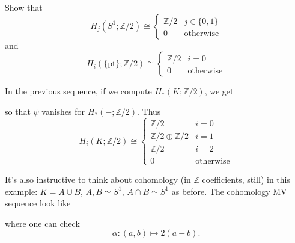 \documentclass[a4paper,11pt]{article}
\begin{document}
	\begin{exer}
		Show that
		\[
			H_j(S^1; \mathbb{Z}/2) \cong \begin{cases}
				\mathbb{Z}/2 & j \in \{0,1\}\\
				0 & \text{otherwise}
			\end{cases}
		\]
		and
		\[
			H_i(\{\text{pt}\};\mathbb{Z}/2)\cong\begin{cases}
				\mathbb{Z}/2 & i=0\\
				0 & \text{otherwise}
			\end{cases}	
		\]
	\end{exer}

	In the previous sequence, if we compute $H_*(K;\mathbb{Z}/2)$, we get
	\begin{center}
	\end{center}
	so that $\psi$ vanishes for $H_*(-; \mathbb{Z}/2)$. Thus
	\[
		H_i (K; \mathbb{Z}/2) \cong \begin{cases}
			\mathbb{Z}/2 & i=0\\
			\mathbb{Z}/2 \oplus \mathbb{Z}/2 & i=1\\
			\mathbb{Z}/2 & i = 2\\
			0 & \text{otherwise}
		\end{cases}
	\]
	
	It's also instructive to think about cohomology (in $\mathbb{Z}$ coefficients, still) in this example: $K = A\cup B$, $A,B\simeq S^1$, $A \cap B \simeq S^1$ as before. The cohomology MV sequence look like
	\begin{center}
	\end{center} 
	where one can check
	\[
		\alpha: (a,b)\mapsto 2(a-b).
	\]
	
\end{document}
